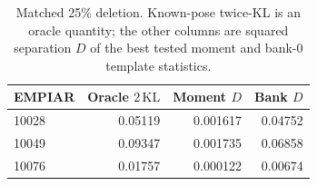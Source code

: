 \begin{table}[t]
\centering\small
\caption{Matched 25\% deletion. Known-pose twice-KL is an oracle quantity; the other columns are squared separation $D$ of the best tested moment and bank-0 template statistics.}
\label{tab:diag-separation}
\begin{tabular}{lrrr}
\toprule
EMPIAR & Oracle $2\,\mathrm{KL}$ & Moment $D$ & Bank $D$\\
\midrule
10028 & 0.05119 & 0.001617 & 0.04752\\
10049 & 0.09347 & 0.001735 & 0.06858\\
10076 & 0.01757 & 0.000122 & 0.00674\\
\bottomrule
\end{tabular}
\end{table}
